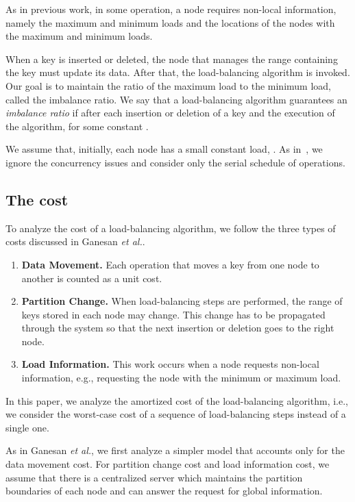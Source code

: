\documentclass[a4paper]{article}
\begin{document}
As in previous work, in some operation, a node requires non-local
information, namely the maximum and minimum loads and the
locations of the nodes with the maximum and minimum loads.

When a key is inserted or deleted, the node that manages the range
containing the key must update its data.  After that, the
load-balancing algorithm is invoked. Our goal is to maintain the ratio
of the maximum load to the minimum load, called the imbalance ratio.
We say that a load-balancing algorithm guarantees an \textit{imbalance
  ratio}  if after each insertion or deletion of a key and the
execution of the algorithm,  for some constant .

We assume that, initially, each node has a small constant load, .
As in~\cite{GanesanBGM04-vldb}, we ignore the concurrency issues and
consider only the serial schedule of operations.

\subsection{The cost}

To analyze the cost of a load-balancing algorithm, we follow the three
types of costs discussed in Ganesan {\em et al.}. 

\begin{enumerate}
\item {\bf Data Movement.} Each operation that moves a key from one
  node to another is counted as a unit cost.
\item {\bf Partition Change.}  When load-balancing steps are
  performed, the range of keys stored in each node may change.  This
  change has to be propagated through the system so that the next
  insertion or deletion goes to the right node.  
\item {\bf Load Information.} This work occurs when a node requests
  non-local information, e.g., requesting the node with the
  minimum or maximum load.
\end{enumerate}

In this paper, we analyze the amortized cost of the load-balancing
algorithm, i.e., we consider the worst-case cost of a sequence of 
load-balancing steps instead of a single one.

As in Ganesan {\em et al.}, we first analyze a simpler model that
accounts only for the data movement cost.  For partition change cost and load
information cost, we assume that there is a centralized server which
maintains the partition boundaries of each node and can answer the
request for global information. 
\end{document}
